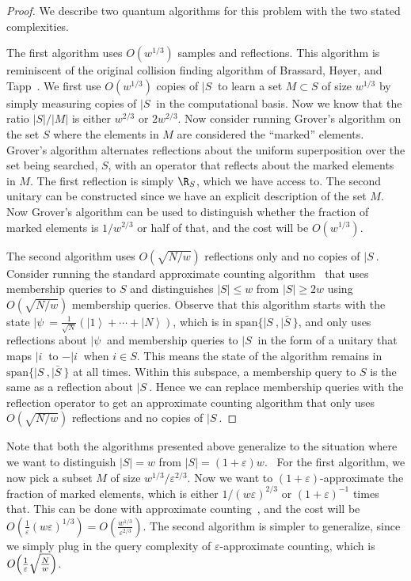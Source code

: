 \begin{proof}
We describe two quantum algorithms for this problem with the two stated complexities.

The first algorithm uses $O(w^{1/3})$ samples and reflections. This algorithm is reminiscent of the original collision finding algorithm of Brassard, H{\o}yer, and Tapp~\cite{BHT98}. We first use $O(w^{1/3})$ copies of $|S\>$ to learn a set $M\subset S$ of size $w^{1/3}$ by simply measuring copies of $|S\>$ in the computational basis. Now we know that the ratio $|S|/|M|$ is either $w^{2/3}$ or $2w^{2/3}$. Now consider running Grover's algorithm on the set $S$ where the elements in $M$ are considered the ``marked'' elements. Grover's algorithm alternates reflections about the uniform superposition over the set being searched, $S$, with an operator that reflects about the marked elements in $M$. The first reflection is simply $\R_S$, which we have access to. The second unitary can be constructed since we have an explicit description of the set $M$. Now Grover's algorithm can be used to distinguish whether the fraction of marked elements is $1/w^{2/3}$ or half of that, and the cost will be $O(w^{1/3})$.

The second algorithm uses $O(\sqrt{{N}/{w}})$ reflections only and no copies of $|S\>$. 
Consider running the standard approximate counting algorithm~\cite{BHMT02} that uses membership queries to $S$ and distinguishes $|S|\leq w$ from $|S|\geq 2w$ using $O(\sqrt{N/w})$ membership queries. 
Observe that this algorithm starts with the state $|\psi\> =\frac{1}{
\sqrt{N}}\left( \left\vert 1\right\rangle +\cdots +\left\vert N\right\rangle
\right)$, which is in $\textrm{span}\{|S\>,|\bar{S}\>\}$, and only uses reflections about $|\psi\> $ and membership queries to $|S\>$ in the form of a unitary that maps $|i\>$ to $-|i\>$ when $i \in S$.
This means the state of the algorithm remains in $\textrm{span}\{|S\>,|\bar{S}\>\}$
at all times. 
Within this subspace, a membership query to $S$ is the same as a reflection about $|S\>$.
Hence we can replace membership queries with the reflection operator to get an approximate counting algorithm that only uses $O(\sqrt{N/w})$ reflections and no copies of $|S\>$.
\end{proof}

Note that both the algorithms presented above generalize to the situation
where we want to distinguish $|S|=w$ from $|S|=(1+\varepsilon )w$. \ For the
first algorithm, we now pick a subset $M$ of size $w^{1/3}/\varepsilon ^{2/3}
$. Now we want to $(1+\varepsilon )$-approximate the fraction of marked
elements, which is either $1/(w\varepsilon )^{2/3}$ or $(1+\varepsilon )^{-1}
$ times that. This can be done with approximate counting~\cite[Theorem 15]
{BHMT02}, and the cost will be $O\left( \frac{1}{\varepsilon }(w\varepsilon
)^{1/3}\right) =O\left( \frac{w^{1/3}}{\varepsilon ^{2/3}}\right) $.
The second algorithm is simpler to generalize, since we simply plug in
the query complexity of $\varepsilon$-approximate counting, which is 
$O\Bigl( \frac{1}{\varepsilon }\sqrt{\frac{N}{w}}\Bigr) $.

